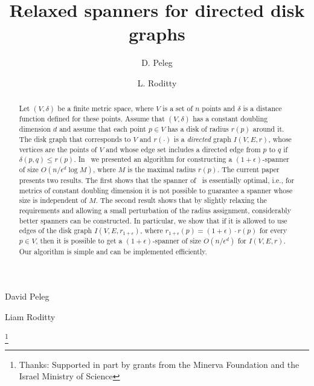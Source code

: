 \documentclass[proceedings]{stacs}
\theoremstyle{plain}\newtheorem{satz}[thm]{Satz}
\theoremstyle{definition}\newtheorem{crucial}[thm]{Crucial Definition}
\newcommand{\eps}{\epsilon}
\begin{document}
\title[Relaxed spanners for directed disk graphs]{Relaxed spanners for directed disk graphs}

\author[lab1]{D. Peleg}{David Peleg}
\address[lab1]{Department of Computer Science and Applied Mathematics,
  \newline The Weizmann Institute of Science, Rehovot 76100, Israel}    


\author[lab2]{L. Roditty}{Liam Roditty}
\address[lab2]{Department of Computer Science, Bar-Ilan University,
\newline Ramat-Gan 52900, Israel}     


\thanks{Thanks: Supported in part by grants from
the Minerva Foundation and the Israel Ministry of Science} 

 




\begin{abstract}
Let $(V,\delta)$ be a finite metric space, where $V$ is a set of
$n$ points and $\delta$ is a distance function defined for these
points. Assume that $(V,\delta)$ has a constant doubling dimension
$d$ and assume that each point $p\in V$ has a disk of radius
$r(p)$ around it. The disk graph that corresponds to $V$ and
$r(\cdot)$ is a \emph{directed} graph $I(V,E,r)$, whose vertices
are the points of $V$ and whose edge set includes a directed edge
from $p$ to $q$ if $\delta(p,q)\leq r(p)$. In~\cite{PeRo08} we
presented an algorithm for constructing a $(1+\eps)$-spanner of
size $O(n/\eps^d \log M)$, where $M$ is the maximal radius $r(p)$.
The current paper presents two results. The first shows that the
spanner of~\cite{PeRo08} is essentially optimal, i.e., for metrics
of constant doubling dimension it is not possible to guarantee a
spanner whose size is independent of $M$. The second result shows
that by slightly relaxing the requirements and allowing a small
perturbation of the radius assignment, considerably better
spanners can be constructed. In particular, we show that if it is
allowed to use edges of the disk graph $I(V,E,r_{1+\eps})$, where
$r_{1+\eps}(p) = (1+\eps)\cdot r(p)$ for every $p\in V$, then it
is possible to get a $(1+\eps)$-spanner of size $O(n/\eps^d)$ for
$I(V,E,r)$. Our algorithm is simple and can be implemented
efficiently.
\end{abstract}

\maketitle
\end{document}

